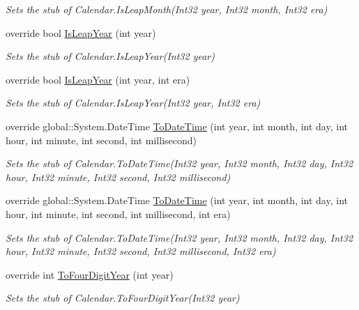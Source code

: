 \begin{DoxyCompactItemize}
\begin{DoxyCompactList}\small\item\em Sets the stub of Calendar.\-Is\-Leap\-Month(\-Int32 year, Int32 month, Int32 era)\end{DoxyCompactList}\item 
override bool \hyperlink{class_system_1_1_globalization_1_1_fakes_1_1_stub_calendar_abf9d0f3fe328866fdaefeb3838b05441}{Is\-Leap\-Year} (int year)
\begin{DoxyCompactList}\small\item\em Sets the stub of Calendar.\-Is\-Leap\-Year(\-Int32 year)\end{DoxyCompactList}\item 
override bool \hyperlink{class_system_1_1_globalization_1_1_fakes_1_1_stub_calendar_a2701c43462891cb157f1084c927d49fc}{Is\-Leap\-Year} (int year, int era)
\begin{DoxyCompactList}\small\item\em Sets the stub of Calendar.\-Is\-Leap\-Year(\-Int32 year, Int32 era)\end{DoxyCompactList}\item 
override global\-::\-System.\-Date\-Time \hyperlink{class_system_1_1_globalization_1_1_fakes_1_1_stub_calendar_abdf9750471dcc29ed0e0c7520d01092f}{To\-Date\-Time} (int year, int month, int day, int hour, int minute, int second, int millisecond)
\begin{DoxyCompactList}\small\item\em Sets the stub of Calendar.\-To\-Date\-Time(\-Int32 year, Int32 month, Int32 day, Int32 hour, Int32 minute, Int32 second, Int32 millisecond)\end{DoxyCompactList}\item 
override global\-::\-System.\-Date\-Time \hyperlink{class_system_1_1_globalization_1_1_fakes_1_1_stub_calendar_a903f2fe0b420521e8d830fa3250e598f}{To\-Date\-Time} (int year, int month, int day, int hour, int minute, int second, int millisecond, int era)
\begin{DoxyCompactList}\small\item\em Sets the stub of Calendar.\-To\-Date\-Time(\-Int32 year, Int32 month, Int32 day, Int32 hour, Int32 minute, Int32 second, Int32 millisecond, Int32 era)\end{DoxyCompactList}\item 
override int \hyperlink{class_system_1_1_globalization_1_1_fakes_1_1_stub_calendar_aec6ec41691ab8c2848557335429adb85}{To\-Four\-Digit\-Year} (int year)
\begin{DoxyCompactList}\small\item\em Sets the stub of Calendar.\-To\-Four\-Digit\-Year(\-Int32 year)\end{DoxyCompactList}\end{DoxyCompactItemize}
